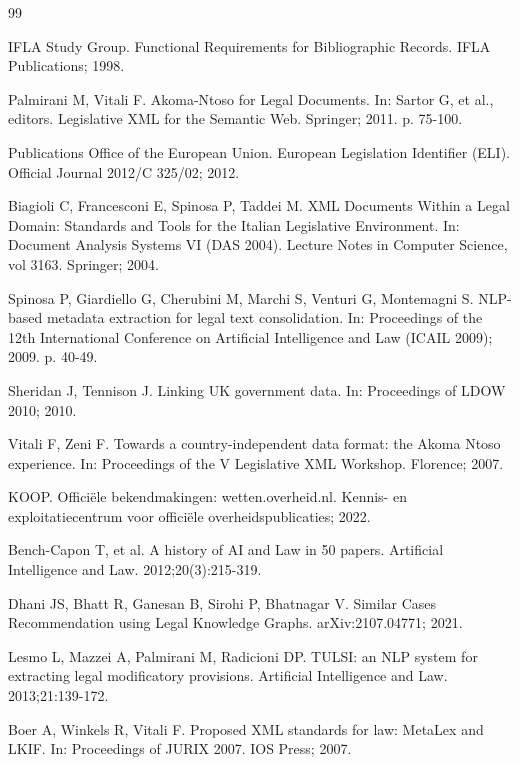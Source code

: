 \documentclass{IOS-Book-Article}
\begin{document}
\begin{thebibliography}{99}

IFLA Study Group. Functional Requirements for Bibliographic Records. IFLA Publications; 1998.

Palmirani M, Vitali F. Akoma-Ntoso for Legal Documents. In: Sartor G, et al., editors.
Legislative XML for the Semantic Web. Springer; 2011. p. 75-100.

Publications Office of the European Union. European Legislation Identifier (ELI). Official
Journal 2012/C 325/02; 2012.

Biagioli C, Francesconi E, Spinosa P, Taddei M. XML Documents Within a Legal Domain:
Standards and Tools for the Italian Legislative Environment. In: Document Analysis Systems
VI (DAS 2004). Lecture Notes in Computer Science, vol 3163. Springer; 2004.

Spinosa P, Giardiello G, Cherubini M, Marchi S, Venturi G, Montemagni S. NLP-based metadata
extraction for legal text consolidation. In: Proceedings of the 12th International Conference
on Artificial Intelligence and Law (ICAIL 2009); 2009. p. 40-49.

Sheridan J, Tennison J. Linking UK government data. In: Proceedings of LDOW 2010; 2010.

Vitali F, Zeni F. Towards a country-independent data format: the Akoma Ntoso experience. In:
Proceedings of the V Legislative XML Workshop. Florence; 2007.

KOOP. Offici\"{e}le bekendmakingen: wetten.overheid.nl. Kennis- en exploitatiecentrum voor
offici\"{e}le overheidspublicaties; 2022.

Bench-Capon T, et al. A history of AI and Law in 50 papers. Artificial Intelligence and Law.
2012;20(3):215-319.

Dhani JS, Bhatt R, Ganesan B, Sirohi P, Bhatnagar V. Similar Cases Recommendation using Legal
Knowledge Graphs. arXiv:2107.04771; 2021.

Lesmo L, Mazzei A, Palmirani M, Radicioni DP. TULSI: an NLP system for extracting legal
modificatory provisions. Artificial Intelligence and Law. 2013;21:139-172.

Boer A, Winkels R, Vitali F. Proposed XML standards for law: MetaLex and LKIF. In:
Proceedings of JURIX 2007. IOS Press; 2007.


\end{thebibliography}
\end{document}
